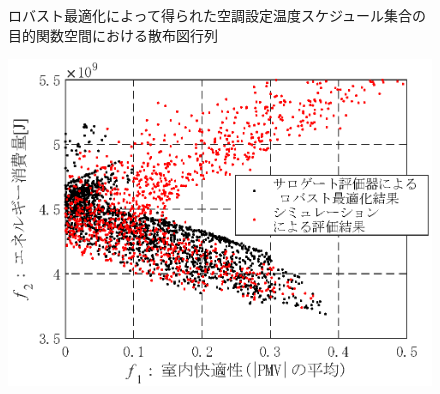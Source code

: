 \begin{figure}[htbp]
\begin{center}
\begin{minipage}{0.8\textwidth}
\begin{center}
      \end{center}
    \end{minipage}
    \vspace{-1mm}
    \caption{ロバスト最適化によって得られた空調設定温度スケジュール集合の目的関数空間における散布図行列}
    \label{fig::surrogate_result_pareto_robust_matrix}
  \end{center}
\end{figure}

\begin{figure}[htbp]
  \begin{center}
    \begin{minipage}{0.7\textwidth}
      \begin{center}
        \includegraphics[width=1\textwidth,keepaspectratio=true]{fig/surrogate_result_pareto_robust_comp_f1f2.eps}\\\vspace{-5mm}{\small (a) $f_1$-$f_2$目的関数空間}
      \end{center}
    \end{minipage}
    \\
    \begin{minipage}{0.7\textwidth}
      \begin{center}

\end{center}
\end{minipage}
\end{center}
\end{figure}
